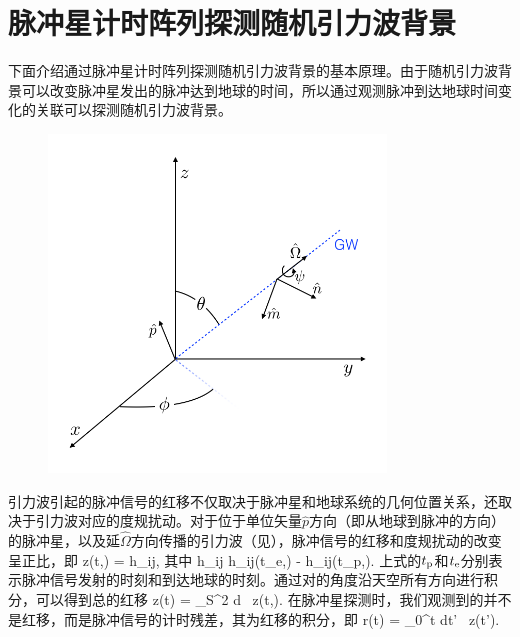 \section{脉冲星计时阵列探测随机引力波背景}
下面介绍通过脉冲星计时阵列探测随机引力波背景的基本原理。由于随机引力波背景可以改变脉冲星发出的脉冲达到地球的时间，所以通过观测脉冲到达地球时间变化的关联可以探测随机引力波背景。
\begin{figure}[htb!]
    \centering
    \includegraphics[width=0.8\textwidth]{Img/pulsar_position_diagram_square}
    \label{position_diagram}
\end{figure}

引力波引起的脉冲信号的红移不仅取决于脉冲星和地球系统的几何位置关系，还取决于引力波对应的度规扰动\cite{Detweiler:1979wn}。对于位于单位矢量$\hat{p}$方向（即从地球到脉冲的方向）的脉冲星，以及延$\hat{\Omega}$方向传播的引力波（见），脉冲信号的红移和度规扰动的改变呈正比，即\cite{Detweiler:1979wn}
%
\beq
z(t,\hat{\Omega}) = 
\Delta h_{ij},
\label{tdredshift}
\eeq
其中
\beq
\Delta h_{ij}
\equiv
h_{ij}(t_{\rm e},\hat{\Omega}) - 
h_{ij}(t_{\rm p},\hat{\Omega}).
\label{delhdef}
\eeq 
上式的$t_{\rm p}$和$t_{\rm e}$分别表示脉冲信号发射的时刻和到达地球的时刻。通过对的角度沿天空所有方向进行积分，可以得到总的红移
\beq
z(t) = \int_{S^2} d\hat{\Omega} \, z(t,\hat{\Omega}).
\label{zftot}
\eeq
在脉冲星探测时，我们观测到的并不是红移，而是脉冲信号的计时残差，其为红移的积分，即
\beq
r(t) = \int_0^{t} dt' \, z(t').
\label{residual}
\eeq


